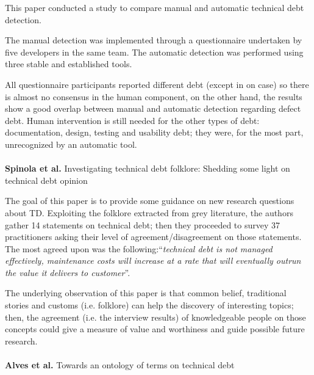 This paper conducted a study to compare manual and automatic technical debt detection. 

The manual detection was implemented through a questionnaire undertaken by five developers in the same team. The automatic detection was performed using three stable and established tools. 

All questionnaire participants reported different debt (except in on case) so there is almost no consensus in the human component, on the other hand, the results show a good overlap between manual and automatic detection regarding defect debt. Human intervention is still needed for the other types of debt: documentation, design, testing and usability debt; they were, for the most part, unrecognized by an automatic tool.
\\
\\
\textbf{Spinola et al.} \cite{spinola2013investigating} Investigating technical debt folklore: Shedding some light on technical debt opinion

The goal of this paper is to provide some guidance on new research questions about TD. Exploiting the folklore extracted from grey literature, the authors gather 14 statements on technical debt; then they proceeded to survey 37 practitioners asking their level of agreement/disagreement on those statements. The most agreed upon was the following:``\emph{technical debt is not managed effectively, maintenance costs will increase at a rate that will eventually outrun the value it delivers to customer}''.

The underlying observation of this paper is that common belief, traditional stories and customs (i.e. folklore) can help the discovery of interesting topics; then, the agreement (i.e. the interview results) of knowledgeable people on those concepts could give a measure of value and worthiness and guide possible future research.
\\
\\
\textbf{Alves et al.} \cite{alves2014towards} Towards an ontology of terms on technical debt

